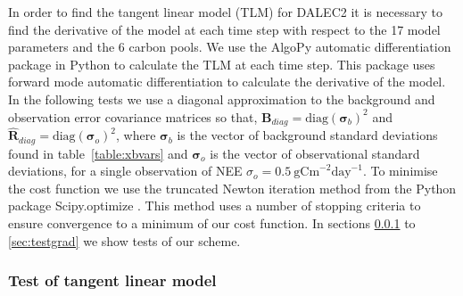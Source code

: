 \documentclass[review]{elsarticle}
\begin{document}
In order to find the tangent linear model (TLM) for DALEC2 it is necessary to find the derivative of the model at each time step with respect to the 17 model parameters and the 6 carbon pools. We use the AlgoPy automatic differentiation package \citep{Walter2013} in Python to calculate the TLM at each time step. This package uses forward mode automatic differentiation to calculate the derivative of the model. In the following tests we use a diagonal approximation to the background and observation error covariance matrices so that, 
$\textbf{B}_{diag}=\text{diag}(\bm{\sigma}_b)^2$ and $\hat{\textbf{R}}_{diag}=\text{diag}(\bm{\sigma}_o )^2$,
where $\bm{\sigma}_b$ is the vector of background standard deviations found in table~\ref{table:xbvars} and $\bm{\sigma}_o$ is the vector of observational standard deviations, for a single observation of NEE $\sigma_o=0.5~\text{gCm}^{-2}\text{day}^{-1}$. To minimise the cost function we use the truncated Newton iteration method \citep{Nocedal1999} from the Python package Scipy.optimize \citep{scipy2015}. This method uses a number of stopping criteria to ensure convergence to a minimum of our cost function. In sections \ref{sec:testtlm} to \ref{sec:testgrad} we show tests of our scheme. 


\subsubsection{Test of tangent linear model} \label{sec:testtlm}
\end{document}
